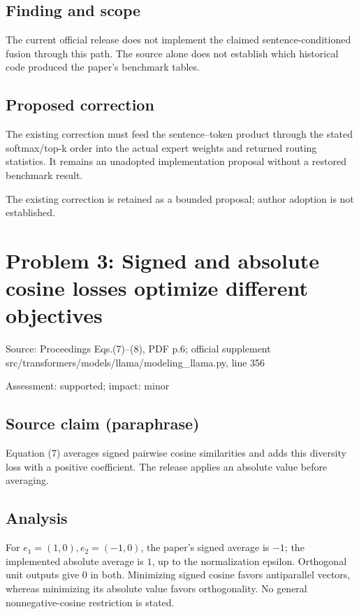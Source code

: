 \documentclass[11pt]{article}
\begin{document}
\subsection*{Finding and scope}

The current official release does not implement the claimed sentence-conditioned fusion through this path. The source alone does not establish which historical code produced the paper’s benchmark tables.

\subsection*{Proposed correction}

The existing correction must feed the sentence–token product through the stated softmax/top-k order into the actual expert weights and returned routing statistics. It remains an unadopted implementation proposal without a restored benchmark result.

The existing correction is retained as a bounded proposal; author adoption is not established.

\section*{Problem 3: Signed and absolute cosine losses optimize different objectives}

Source: Proceedings Eqs.(7)–(8), PDF p.6; official supplement src/transformers/models/llama/modeling\_llama.py, line 356

Assessment: supported; impact: minor

\subsection*{Source claim (paraphrase)}

Equation (7) averages signed pairwise cosine similarities and adds this diversity loss with a positive coefficient. The release applies an absolute value before averaging.

\subsection*{Analysis}

For \(e_1=(1,0),e_2=(-1,0)\), the paper’s signed average is \(-1\); the implemented absolute average is \(1\), up to the normalization epsilon. Orthogonal unit outputs give \(0\) in both. Minimizing signed cosine favors antiparallel vectors, whereas minimizing its absolute value favors orthogonality. No general nonnegative-cosine restriction is stated.
\end{document}
